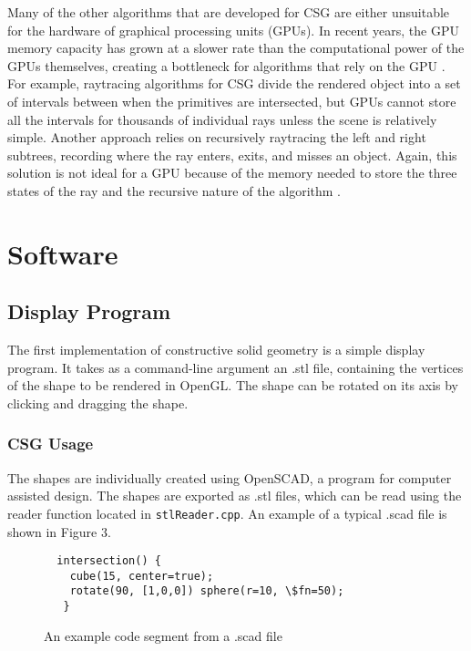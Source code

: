 \documentclass[12pt]{article}
\begin{document}
\begin{doublespace}
Many of the other algorithms that are developed for CSG are either unsuitable for the hardware of graphical processing units (GPUs). In recent years, the GPU memory capacity has grown at a slower rate than the computational power of the GPUs themselves, creating a bottleneck for algorithms that rely on the GPU \cite{interactive_csg}. For example, raytracing algorithms for CSG divide the rendered object into a set of intervals between when the primitives are intersected, but GPUs cannot store all the intervals for thousands of individual rays unless the scene is relatively simple. Another approach relies on recursively raytracing the left and right subtrees, recording where the ray enters, exits, and misses an object. Again, this solution is not ideal for a GPU because of the memory needed to store the three states of the ray and the recursive nature of the algorithm \cite{interactive_csg}.
\section{Software}
\subsection{Display Program}
The first implementation of constructive solid geometry is a simple display program. It takes as a command-line argument an .stl file, containing the vertices of the shape to be rendered in OpenGL. The shape can be rotated on its axis by clicking and dragging the shape.
\subsubsection{CSG Usage}
The shapes are individually created using OpenSCAD, a program for computer assisted design. The shapes are exported as .stl files, which can be read using the reader function located in \texttt{stlReader.cpp}. An example of a typical .scad file is shown in Figure 3.\\
\lstset{language=scad}
\begin{figure}[h]
\begin{lstlisting}
  intersection() {
    cube(15, center=true);
    rotate(90, [1,0,0]) sphere(r=10, \$fn=50);
   }
\end{lstlisting}
\centering
\caption{An example code segment from a .scad file}
\end{figure}


\end{doublespace}
\end{document}
